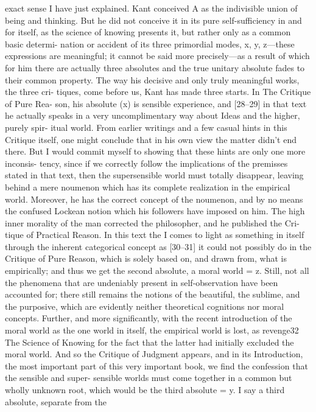 exact sense I have just explained. Kant conceived A as the indivisible union of
being and thinking.
But he did not conceive it in its pure self-sufficiency in and for itself, as
the science of knowing presents it, but rather only as a common basic determi-
nation or accident of its three primordial modes, x, y, z—these expressions are
meaningful; it cannot be said more precisely—as a result of which for him
there are actually three absolutes and the true unitary absolute fades to their
common property.
The way his decisive and only truly meaningful works, the three cri-
tiques, come before us, Kant has made three starts. In The Critique of Pure Rea-
son, his absolute (x) is sensible experience, and [28–29] in that text he actually
speaks in a very uncomplimentary way about Ideas and the higher, purely spir-
itual world. From earlier writings and a few casual hints in this Critique itself,
one might conclude that in his own view the matter didn’t end there. But I
would commit myself to showing that these hints are only one more inconsis-
tency, since if we correctly follow the implications of the premisses stated in
that text, then the supersensible world must totally disappear, leaving behind a
mere noumenon which has its complete realization in the empirical world.
Moreover, he has the correct concept of the noumenon, and by no means the
confused Lockean notion which his followers have imposed on him. The high
inner morality of the man corrected the philosopher, and he published the Cri-
tique of Practical Reason. In this text the I comes to light as something in itself
through the inherent categorical concept as [30–31] it could not possibly do in
the Critique of Pure Reason, which is solely based on, and drawn from, what is
empirically; and thus we get the second absolute, a moral world = z. Still, not
all the phenomena that are undeniably present in self-observation have been
accounted for; there still remains the notions of the beautiful, the sublime, and
the purposive, which are evidently neither theoretical cognitions nor moral
concepts. Further, and more significantly, with the recent introduction of the
moral world as the one world in itself, the empirical world is lost, as revenge32
The Science of Knowing
for the fact that the latter had initially excluded the moral world. And so the
Critique of Judgment appears, and in its Introduction, the most important part
of this very important book, we find the confession that the sensible and super-
sensible worlds must come together in a common but wholly unknown root,
which would be the third absolute = y. I say a third absolute, separate from the
